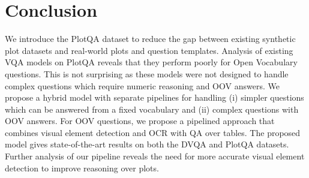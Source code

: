 \documentclass[10pt,twocolumn,letterpaper]{article}
\begin{document}

\section{Conclusion}
We introduce the PlotQA dataset to reduce the gap between existing synthetic plot datasets and real-world plots and question templates.
Analysis of existing VQA models on PlotQA reveals that they perform poorly for Open Vocabulary questions. This is not surprising as these models were not designed to handle complex questions which require numeric reasoning and OOV answers. We propose a hybrid model with separate pipelines for handling (i) simpler questions which can be answered from a fixed vocabulary and (ii) complex questions with OOV answers. For OOV questions, we propose a pipelined approach that combines visual element detection and OCR with QA over tables. The proposed model gives state-of-the-art results on both the DVQA and PlotQA datasets. 
Further analysis of our pipeline reveals the need for more accurate visual element detection to improve reasoning over plots.





\end{document}
